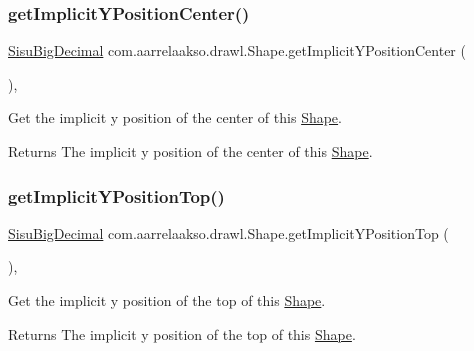 \subsubsection{\texorpdfstring{get\+Implicit\+Y\+Position\+Center()}{getImplicitYPositionCenter()}}
{\footnotesize\ttfamily \hyperlink{classcom_1_1aarrelaakso_1_1drawl_1_1_sisu_big_decimal}{Sisu\+Big\+Decimal} com.\+aarrelaakso.\+drawl.\+Shape.\+get\+Implicit\+Y\+Position\+Center (\begin{DoxyParamCaption}{ }\end{DoxyParamCaption})\hspace{0.3cm}{\ttfamily [protected]}, {\ttfamily [inherited]}}



Get the implicit y position of the center of this \hyperlink{classcom_1_1aarrelaakso_1_1drawl_1_1_shape}{Shape}. 

\begin{DoxyReturn}{Returns}
The implicit y position of the center of this \hyperlink{classcom_1_1aarrelaakso_1_1drawl_1_1_shape}{Shape}. 
\end{DoxyReturn}
\mbox{\label{classcom_1_1aarrelaakso_1_1drawl_1_1_shape_a5ffc02627cca0723e3555b5d04ba2b75}} 
\subsubsection{\texorpdfstring{get\+Implicit\+Y\+Position\+Top()}{getImplicitYPositionTop()}}
{\footnotesize\ttfamily \hyperlink{classcom_1_1aarrelaakso_1_1drawl_1_1_sisu_big_decimal}{Sisu\+Big\+Decimal} com.\+aarrelaakso.\+drawl.\+Shape.\+get\+Implicit\+Y\+Position\+Top (\begin{DoxyParamCaption}{ }\end{DoxyParamCaption})\hspace{0.3cm}{\ttfamily [protected]}, {\ttfamily [inherited]}}



Get the implicit y position of the top of this \hyperlink{classcom_1_1aarrelaakso_1_1drawl_1_1_shape}{Shape}. 

\begin{DoxyReturn}{Returns}
The implicit y position of the top of this \hyperlink{classcom_1_1aarrelaakso_1_1drawl_1_1_shape}{Shape}. 
\end{DoxyReturn}
\mbox{\label{classcom_1_1aarrelaakso_1_1drawl_1_1_shape_a2b19d5964ac46d545a7bae3133df6532}} 

